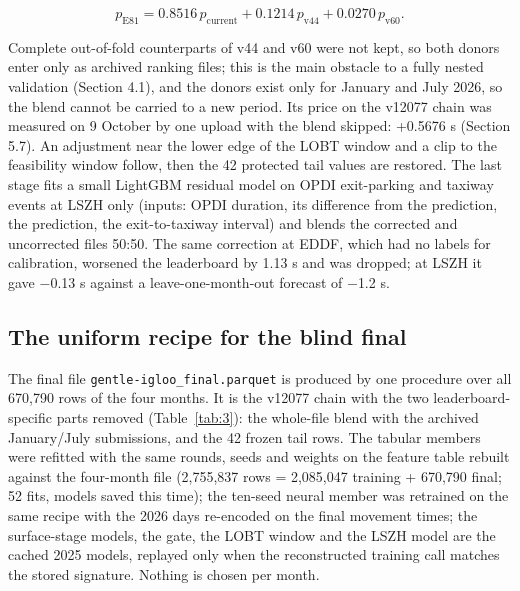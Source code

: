 \documentclass[
  manuscript=article,  %
  layout=preprint,     %
  year=2026,
  volume=4,
]{extra/joas}
\begin{document}
\begin{equation}p_{\mathrm{E81}} = 0.8516\,p_{\mathrm{current}} + 0.1214\,p_{\mathrm{v44}} + 0.0270\,p_{\mathrm{v60}}.\end{equation}

Complete out-of-fold counterparts of v44 and v60 were not kept, so both donors enter only as archived ranking files; this is the main obstacle to a fully nested validation (Section 4.1), and the donors exist only for January and July 2026, so the blend cannot be carried to a new period. Its price on the v12077 chain was measured on 9 October by one upload with the blend skipped: +0.5676 s (Section 5.7). An adjustment near the lower edge of the LOBT window and a clip to the feasibility window follow, then the 42 protected tail values are restored. The last stage fits a small LightGBM residual model on OPDI exit-parking and taxiway events at LSZH only (inputs: OPDI duration, its difference from the prediction, the prediction, the exit-to-taxiway interval) and blends the corrected and uncorrected files 50:50. The same correction at EDDF, which had no labels for calibration, worsened the leaderboard by 1.13 s and was dropped; at LSZH it gave $-$0.13 s against a leave-one-month-out forecast of $-$1.2 s.

\subsection{The uniform recipe for the blind final}\label{the-uniform-recipe-for-the-blind-final}

The final file \texttt{gentle-igloo\_\allowbreak{}final.parquet} is produced by one procedure over all 670,790 rows of the four months. It is the v12077 chain with the two leaderboard-specific parts removed (Table~\ref{tab:3}): the whole-file blend with the archived January/July submissions, and the 42 frozen tail rows. The tabular members were refitted with the same rounds, seeds and weights on the feature table rebuilt against the four-month file (2,755,837 rows = 2,085,047 training + 670,790 final; 52 fits, models saved this time); the ten-seed neural member was retrained on the same recipe with the 2026 days re-encoded on the final movement times; the surface-stage models, the gate, the LOBT window and the LSZH model are the cached 2025 models, replayed only when the reconstructed training call matches the stored signature. Nothing is chosen per month.
\end{document}

